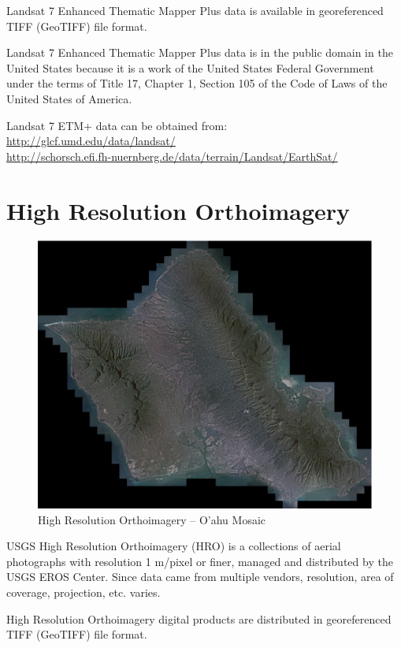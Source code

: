 Landsat 7 Enhanced Thematic Mapper Plus data is available in georeferenced TIFF (GeoTIFF) file format.

Landsat 7 Enhanced Thematic Mapper Plus data is in the public domain in the United States because it is a work of the United States Federal Government under the terms of Title 17, Chapter 1, Section 105 of the Code of Laws of the United States of America.

Landsat 7 ETM+ data can be obtained from: \cite{Terrain-LandsatGLCF, Terrain-LandsatTHN} \\
\url{http://glcf.umd.edu/data/landsat/} \\
\url{http://schorsch.efi.fh-nuernberg.de/data/terrain/Landsat/EarthSat/}

\section{High Resolution Orthoimagery}

\begin{figure}[h!]
  \centering
  \includegraphics[width=120mm]{images/usgs_hro_oahu.eps}
  \caption{High Resolution Orthoimagery -- O'ahu Mosaic}
\end{figure}

USGS High Resolution Orthoimagery (HRO) is a collections of aerial photographs with resolution 1 m/pixel or finer, managed and distributed by the USGS EROS Center. Since data came from multiple vendors, resolution, area of coverage, projection, etc. varies.

High Resolution Orthoimagery digital products are distributed in georeferenced TIFF (GeoTIFF) file format.

